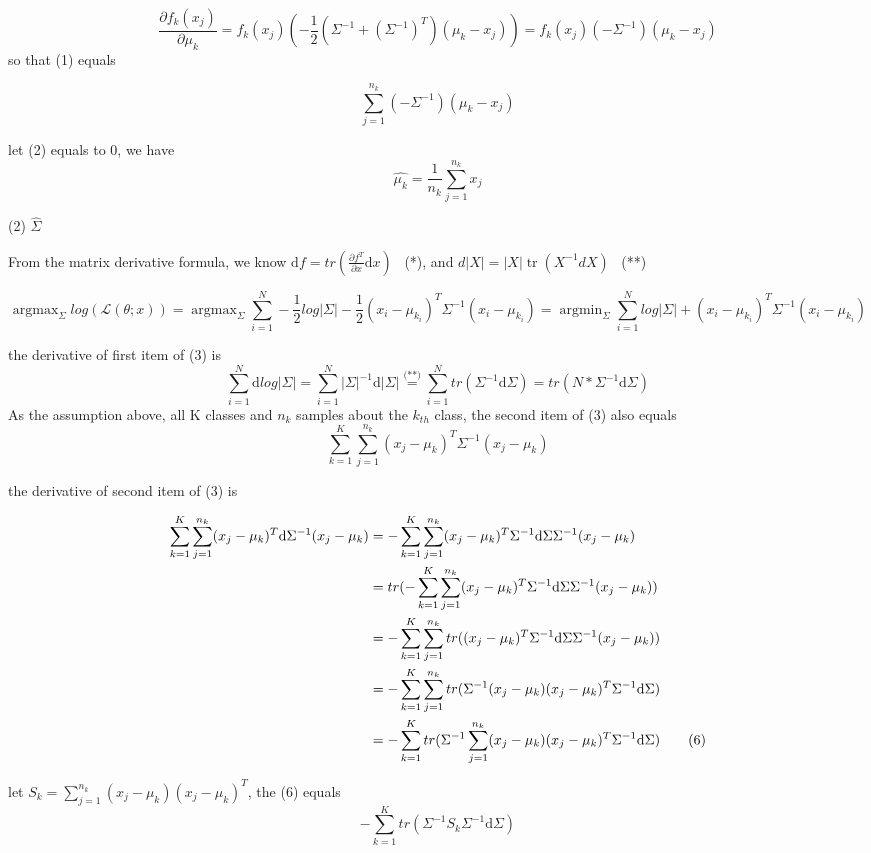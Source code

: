 \documentclass[10pt,a4paper]{article}
\begin{document}
$$ 
	\frac{\partial f_{k}(x_j)}{\partial \mu_{k}} = f_k(x_j) (-\frac{1}{2}(\Sigma^{-1}+(\Sigma^{-1})^T)(\mu_{k}-x_j)) = f_k(x_j) (-\Sigma^{-1})(\mu_{k}-x_j)
$$
so that (1) equals

\[ 
\sum_{j=1}^{n_k}(-\Sigma^{-1})(\mu_{k}-x_j)
\tag{2}
\]

let (2) equals to 0, we have
\[ 
\hat{\mu_{k}}=\frac{1}{n_{k}}\sum_{j=1}^{n_k}x_j
\]


(2) $\hat{\Sigma}$

From the matrix derivative formula, we know $\mathrm{d}f=tr(\frac{\partial f^T}{\partial x} \mathrm{d} x) $ \  (*), and $d|X|=|X| \operatorname{tr}\left(X^{-1} d X\right)$ \  (**)

\[ \mathop{\arg\max}_{\Sigma}log(\mathcal{L}(\theta;x)) = \mathop{\arg\max}_{\Sigma} \sum_{i=1}^{N}-\frac{1}{2}log|\Sigma|-\frac{1}{2}(x_i-\mu_{k_i})^T\Sigma^{-1}(x_i-\mu_{k_i})= \mathop{\arg\min}_{\Sigma} \sum_{i=1}^{N}log|\Sigma|+(x_i-\mu_{k_i})^T\Sigma^{-1}(x_i-\mu_{k_i}) \tag{3}\]

the derivative of first item of (3) is
\[ 
\sum_{i=1}^{N}\mathrm{d}log|\Sigma|=\sum_{i=1}^{N}|\Sigma|^{-1}\mathrm{d}|\Sigma|\overset{\text{(**)}}{=}\sum_{i=1}^{N}tr(\Sigma^{-1}\mathrm{d}\Sigma)=tr(N*\Sigma^{-1}\mathrm{d}\Sigma)
\tag{4}
 \]
As the assumption above, all K classes and $n_k$ samples about the $k_{th}$ class, the second item of (3) also equals
\[ 
\sum_{k=1}^{K}\sum_{j=1}^{n_k}(x_j-\mu_{k})^T\Sigma^{-1}(x_j-\mu_{k})
\tag{5}
\]

 
the derivative of second item of (3) is


\begin{align}
	\sum_{k=1}^{K}\sum_{j=1}^{n_k}(x_j-\mu_{k})^T\mathrm{d}\Sigma^{-1}(x_j-\mu_{k}) 
	& = -\sum_{k=1}^{K}\sum_{j=1}^{n_k}(x_j-\mu_{k})^T\Sigma^{-1}\mathrm{d}\Sigma\Sigma^{-1}(x_j-\mu_{k}) \notag \\
	& = tr(-\sum_{k=1}^{K}\sum_{j=1}^{n_k}(x_j-\mu_{k})^T\Sigma^{-1}\mathrm{d}\Sigma\Sigma^{-1}(x_j-\mu_{k})) \notag \\
	& = -\sum_{k=1}^{K}\sum_{j=1}^{n_k}tr((x_j-\mu_{k})^T\Sigma^{-1}\mathrm{d}\Sigma\Sigma^{-1}(x_j-\mu_{k}))	\notag \\
	& = -\sum_{k=1}^{K}\sum_{j=1}^{n_k}tr(\Sigma^{-1}(x_j-\mu_{k})(x_j-\mu_{k})^T\Sigma^{-1}\mathrm{d}\Sigma)	\notag \\
	& = -\sum_{k=1}^{K}tr(\Sigma^{-1}\sum_{j=1}^{n_k}(x_j-\mu_{k})(x_j-\mu_{k})^T\Sigma^{-1}\mathrm{d}\Sigma)	\tag{6}
\end{align}

let $S_k=\sum_{j=1}^{n_k}(x_j-\mu_{k})(x_j-\mu_{k})^T$, the (6) equals 
\[ 
-\sum_{k=1}^{K}tr(\Sigma^{-1}S_k\Sigma^{-1}\mathrm{d}\Sigma)
\tag{7}
 \]
\end{document}
